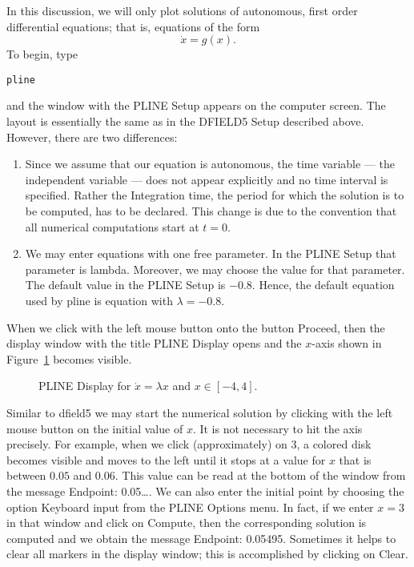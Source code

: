 \documentclass{ximera}
\begin{document}
In this discussion, we will only plot solutions of autonomous,
first order differential equations; that is, equations of the
form
\[
\dot{x} = g(x).
\]
To begin, type
\begin{verbatim}
pline
\end{verbatim}
and the window with the {\sf PLINE Setup} appears on the
computer screen.  The layout is essentially the same as in the
{\sf DFIELD5 Setup} described above.  However, there are two
differences:
\begin{enumerate}
\item Since we assume that our equation is autonomous, the time
variable --- the independent variable --- does
not appear explicitly and no time interval is specified.  Rather
the {\sf Integration time}, the period for which the solution is
to be computed, has to be declared.  This change is due to the
convention that all numerical computations start at $t=0$.
\item We may enter equations with one free parameter.
In the {\sf PLINE Setup} that parameter is {\sf lambda}.
Moreover, we may choose the value for that parameter.  The
default value in the {\sf PLINE Setup} is $-0.8$.  Hence, the
default equation used by {\sf pline} is equation
 with $\lambda = -0.8$.
\end{enumerate}

When we click with the left mouse button onto the button {\sf
Proceed}, then the display window with the title {\sf PLINE
Display} opens and the $x$-axis shown in Figure~\ref{pl_dsp1}
becomes visible.

\begin{figure}[htb]
     \centerline{%
     }
     \caption{{\sf PLINE Display} for $\dot{x}=\lambda x$
                and $x\in [-4,4]$.}
     \label{pl_dsp1}
\end{figure}

Similar to {\sf dfield5} we may start the numerical solution by
clicking with the left mouse button on the initial value of $x$.
It is not necessary to hit the axis precisely.  For example,
when we click (approximately) on $3$, a colored disk becomes
visible and moves to the left until it stops at a value for $x$
that is between $0.05$ and $0.06$.  This value can be read at
the bottom of the window from the message {\sf Endpoint:
0.05\ldots}.  We can also enter the initial point by choosing
the option {\sf Keyboard input} from the {\sf PLINE Options}
menu.  In fact, if we enter $x=3$ in that window and click on
{\sf Compute}, then the corresponding solution is computed and
we obtain the message {\sf Endpoint: 0.05495}.  Sometimes it
helps to clear all markers in the display window; this is
accomplished by clicking on {\sf Clear}.
\end{document}
